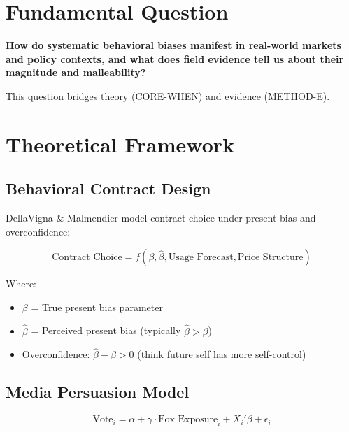\section{Fundamental Question}

\begin{tcolorbox}[colback=yellow!10!white,colframe=orange!75!black,title=Central Research Question]
\textbf{How do systematic behavioral biases manifest in real-world markets and policy contexts, and what does field evidence tell us about their magnitude and malleability?}
\end{tcolorbox}

This question bridges theory (CORE-WHEN) and evidence (METHOD-E).

\section{Theoretical Framework}

\subsection{Behavioral Contract Design}

DellaVigna \& Malmendier model contract choice under present bias and overconfidence:

\begin{equation}
\text{Contract Choice} = f(\beta, \hat{\beta}, \text{Usage Forecast}, \text{Price Structure})
\end{equation}

Where:
\begin{itemize}
    \item $\beta$ = True present bias parameter
    \item $\hat{\beta}$ = Perceived present bias (typically $\hat{\beta} > \beta$)
    \item Overconfidence: $\hat{\beta} - \beta > 0$ (think future self has more self-control)
\end{itemize}

\subsection{Media Persuasion Model}

\begin{equation}
\text{Vote}_i = \alpha + \gamma \cdot \text{Fox Exposure}_i + X_i'\beta + \epsilon_i
\end{equation}

